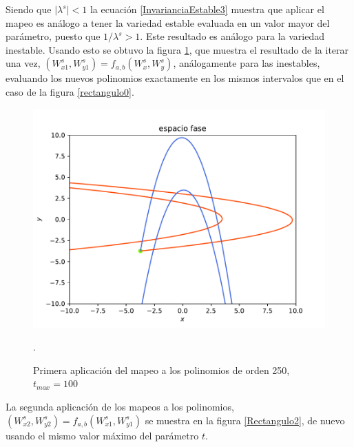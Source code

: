 Siendo que $\vert \lambda^{s} \vert < 1 $ la ecuación \ref{InvarianciaEstable3} muestra que aplicar el mapeo es análogo a tener la variedad estable evaluada en un valor mayor del parámetro, puesto que $1/\lambda^{s}>1$. Este resultado es análogo para la variedad inestable. Usando esto se obtuvo la figura \ref{Rectangulo1}, que muestra el resultado de la iterar una vez, $(W_{x1}^{s},W_{y1}^{s})=f_{a,b}(W_{x}^{s},W_{y}^{s})$, análogamente para las inestables, evaluando los nuevos polinomios exactamente en los mismos intervalos que en el caso de la figura \ref{rectangulo0}.
\begin{figure}[H]
\centering
\includegraphics[scale=0.5]{rectangulo1}
\caption{Primera aplicación del mapeo a los polinomios de orden 250, $t_{max}=100$}.
\label{Rectangulo1}
\end{figure}
La segunda aplicación de los mapeos a los polinomios, $(W_{x2}^{s},W_{y2}^{s})=f_{a,b}(W_{x1}^{s},W_{y1}^{s})$ se muestra en la figura \ref{Rectangulo2}, de nuevo usando el mismo valor máximo del parámetro $t$.
